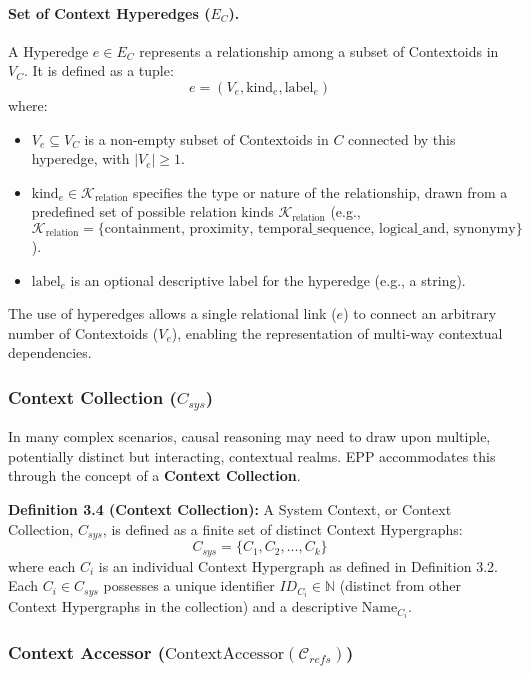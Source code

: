     \paragraph*{Set of Context Hyperedges (\(E_C\)).}
    A Hyperedge \( e \in E_C \) represents a relationship among a subset of Contextoids in \(V_C\). It is defined as a tuple:
    \[ e = (V_e, \text{kind}_e, \text{label}_e) \]
    where:
    \begin{itemize} \setlength\itemsep{0em} %
        \item \( V_e \subseteq V_C \) is a non-empty subset of Contextoids in \(C\) connected by this hyperedge, with \(|V_e| \ge 1\).
        \item \( \text{kind}_e \in \mathcal{K}_{\text{relation}} \) specifies the type or nature of the relationship, drawn from a predefined set of possible relation kinds \(\mathcal{K}_{\text{relation}}\) (e.g., \(\mathcal{K}_{\text{relation}} = \{\text{containment, proximity, temporal\_sequence, logical\_and, synonymy}\}\)).
        \item \( \text{label}_e \) is an optional descriptive label for the hyperedge (e.g., a string).
    \end{itemize}
    The use of hyperedges allows a single relational link (\(e\)) to connect an arbitrary number of Contextoids (\(V_e\)), enabling the representation of multi-way contextual dependencies.

\subsubsection[Context Collection (C\_sys)]{Context Collection (\(C_{sys}\))} 
    \label{ssec:context_collection_formal}

    In many complex scenarios, causal reasoning may need to draw upon multiple, potentially distinct but interacting, contextual realms. EPP accommodates this through the concept of a \textbf{Context Collection}.

    \noindent\textbf{Definition 3.4 (Context Collection):} A System Context, or Context Collection, \(C_{sys}\), is defined as a finite set of distinct Context Hypergraphs:  \[ C_{sys} = \{C_1, C_2, \dots, C_k\} \] where each \( C_i \) is an individual Context Hypergraph as defined in Definition 3.2. Each \(C_i \in C_{sys}\) possesses a unique identifier \(ID_{C_i} \in \mathbb{N}\) (distinct from other Context Hypergraphs in the collection) and a descriptive \(\text{Name}_{C_i}\).


    \subsubsection[Context Accessor (ContextAccessor C\_refs)]{Context Accessor (\(\text{ContextAccessor}(\mathcal{C}_{refs})\))}
    \label{ssec:context_accessor_formal}

